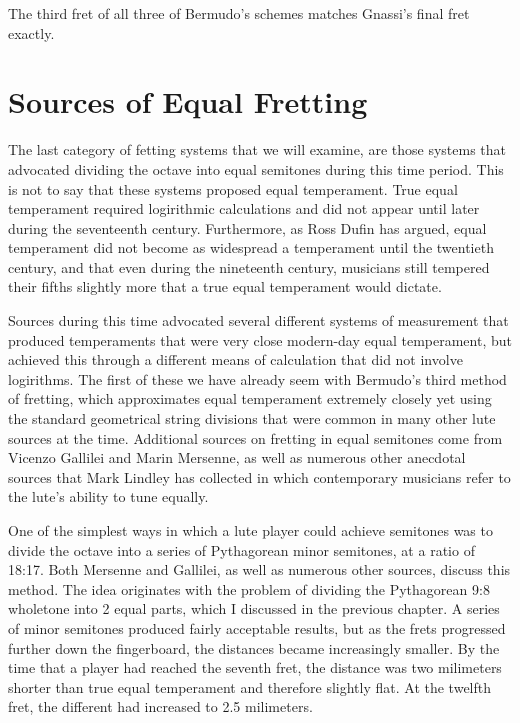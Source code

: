 

The third fret of all three of Bermudo's schemes matches Gnassi's final fret exactly.




\section{Sources of Equal Fretting}

The last category of fetting systems that we will examine, are those systems that advocated
dividing the octave into equal semitones during this time period.  This is not to say that these
systems proposed equal temperament.  True
equal temperament required logirithmic calculations and did not appear until later during the
seventeenth century.  Furthermore, as Ross Dufin has argued, equal temperament did not become
as widespread a temperament until the twentieth century, and that even during the nineteenth
century, musicians still tempered their fifths slightly more that a true equal temperament would
dictate.

Sources during this time advocated several different systems of measurement that produced
temperaments that were very close modern-day equal temperament, but achieved this through
a different means of calculation that did not involve logirithms.  The first of these
we have already seem with Bermudo's third method of fretting, which approximates equal temperament
extremely closely yet using the standard geometrical string divisions that were common in many
other lute sources at the time.  Additional sources on
fretting in equal semitones come from Vicenzo Gallilei and Marin Mersenne, as well as
numerous other anecdotal sources that Mark Lindley has collected in which contemporary
musicians refer to the lute's ability to tune equally.

One of the simplest ways in which a lute player could achieve
semitones was to divide the octave into a series of Pythagorean minor semitones, at a ratio of
18:17.  Both Mersenne and Gallilei, as well as numerous other sources, discuss this method.  The
idea originates with the problem of dividing the Pythagorean 9:8 wholetone into 2 equal parts,
which I discussed in the previous chapter.  A series of minor semitones produced fairly
acceptable results, but as the frets progressed further down the fingerboard, the distances
became increasingly smaller.  By the time that a player had reached the seventh fret, the distance
was two milimeters shorter than true equal temperament and therefore slightly flat.  At the
twelfth fret, the different had increased to 2.5 milimeters.

